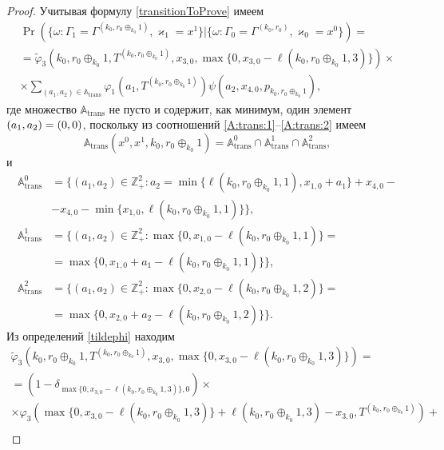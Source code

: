 \begin{proof}
Учитывая формулу \eqref{transitionToProve} имеем
\begin{multline*}
\Pr (\{\omega\colon \Gamma_{1}=\Gamma^{(k_0,  r_0\oplus_{k_0}1)}, \varkappa_{1}=x^1 \}|\{\omega\colon  \Gamma_{0}=\Gamma^{(k_0,  r_0)},  \varkappa_0=x^0\})=\\
=\widetilde{\varphi}_3(k_0,  r_0\oplus_{k_0}1,  T^{(k_0,  r_0\oplus_{k_0}1)}, x_{3,  0}, \max{\{0,  x_{3, 0} - \ell(k_0,  r_0\oplus_{k_0}1,  3)\}})\times \\
\times
\sum_{(a_1,  a_2)\in {\mathbb A}_{\mathrm{trans}}}\varphi_1(a_1,  T^{(k_0,  r_0\oplus_{k_0}1)})  \psi(a_2,  x_{4, 0},  p_{k_0,  r_0\oplus_{k_0}1}), 
\end{multline*}
где множество ${\mathbb A}_{\mathrm{trans}}$ не пусто и содержит,  как минимум,  один элемент $(a_1,  a_2)\hm=(0, 0)$,  поскольку из соотношений \eqref{A:trans:1}--\eqref{A:trans:2} имеем
\begin{equation*}
{\mathbb A}_{\mathrm{trans}}(x^0,  x^1,  k_0,  r_0\oplus_{k_0}1) = {\mathbb A}_{\mathrm{trans}}^0 \cap {\mathbb A}_{\mathrm{trans}}^1\cap {\mathbb A}_{\mathrm{trans}}^2, 
\end{equation*}
и
\begin{align*}
{\mathbb A}_{\mathrm{trans}}^0 &= \{(a_1,  a_2) \in \mathbb{Z}_+^2 \colon a_2 = \min{\{\ell(k_0,  r_0\oplus_{k_0}1,  1),  x_{1,  0}+a_1}\} +x_{4, 0}- \\ 
&-x_{4,  0} - \min{\{x_{1,  0},  \ell(k_0,  r_0\oplus_{k_0}1,  1)\}}\}, \\
{\mathbb A}_{\mathrm{trans}}^1 &= \{(a_1,  a_2) \in \mathbb{Z}_+^2 \colon \max{\{0,  x_{1, 0} - \ell(k_0,  r_0\oplus_{k_0}1,  1)\}}=\\
&=\max{\{0,  x_{1, 0}+a_1-\ell(k_0,  r_0\oplus_{k_0}1,  1)\}}\}, \\
 {\mathbb A}_{\mathrm{trans}}^2 &= \{(a_1,  a_2) \in \mathbb{Z}_+^2 \colon  \max{\{0,  x_{2, 0} - \ell(k_0,  r_0\oplus_{k_0}1,  2)\}}=\\
 &=\max{\{0,  x_{2, 0}+a_2-\ell(k_0,  r_0\oplus_{k_0}1,  2)\}}\}.
\end{align*}
Из определений \eqref{tildephi} находим
\begin{multline*}
\widetilde{\varphi}_3(k_0,  r_0\oplus_{k_0}1,  T^{(k_0, r_0\oplus_{k_0}1)},  x_{3, 0},  \max{\{0,  x_{3, 0} - \ell(k_0,  r_0\oplus_{k_0}1,  3)\}})= \\=(1-\delta_{\max{\{0,  x_{3, 0} - \ell(k_0,  r_0\oplus_{k_0}1,  3)\}}, 0}) \times \\\times\varphi_3(\max{\{0,  x_{3, 0} - \ell(k_0,  r_0\oplus_{k_0}1,  3)\}} + \ell (k_0,  r_0\oplus_{k_0}1,  3) - x_{3,  0},  T^{(k_0,  r_0\oplus_{k_0}1)} ) +\\

\end{multline*}
\end{proof}
